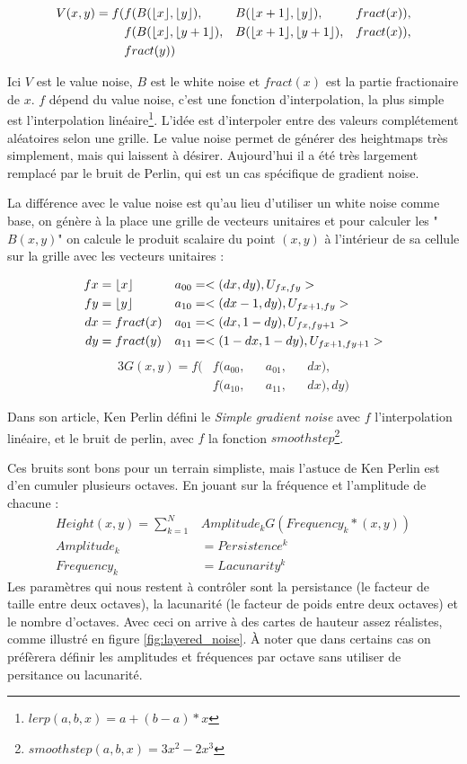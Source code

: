 \documentclass[11pt]{article} %
\DeclarePairedDelimiter\floor{\lfloor}{\rfloor}%
\DeclarePairedDelimiter\fract{fract(}{)}
\begin{document}
\begin{alignat*}{3}
	V(x,y) =f( &f(B(\floor{x},\floor{y}), &&B(\floor{x+1},\floor{y}), &&\fract{x}),\\
			&f(B(\floor{x},\floor{y+1}), &&B(\floor{x+1},\floor{y+1}), &&\fract{x}),\\
			&\fract{y})
\end{alignat*}

Ici $V$ est le value noise, $B$ est le white noise et $fract(x)$ est la partie fractionaire de $x$. $f$ dépend du value noise, c'est une fonction d'interpolation, la plus simple est l'interpolation linéaire\footnote{$lerp(a,b,x) = a+(b-a)*x$}.
L'idée est d'interpoler entre des valeurs complétement aléatoires selon une grille. Le value noise permet de générer des heightmaps très simplement, mais qui laissent à désirer. Aujourd'hui il a été très largement remplacé par le bruit de Perlin, qui est un cas spécifique de gradient noise.

La différence avec le value noise est qu'au lieu d'utiliser un white noise comme base, on génère à la place une grille de vecteurs unitaires et pour calculer les "$B(x,y)$" on calcule le produit scalaire du point $(x,y)$ à l'intérieur de sa cellule sur la grille avec les vecteurs unitaires :

\begin{align*}
	fx&=\floor{x} & a_{00}&=<(dx,dy), U_{fx,fy}>\\
	fy&=\floor{y} & a_{10}&=<(dx-1,dy), U_{fx+1,fy}>\\
	dx&=\fract{x} & a_{01}&=<(dx,1-dy), U_{fx,fy+1}>\\
	dy&=\fract{y} & a_{11}&=<(1-dx,1-dy), U_{fx+1,fy+1}>
\end{align*}
\begin{alignat*}{3}
	G(x,y) =f( &f(a_{00}, &&a_{01}, &&dx),\\
			&f(a_{10}, &&a_{11}, &&dx), dy)
\end{alignat*}

Dans son article\cite{perlinnoise}, Ken Perlin défini le \textit{Simple gradient noise} avec $f$ l'interpolation linéaire, et le bruit de perlin, avec $f$ la fonction $smoothstep$\footnote{$smoothstep(a,b,x) = 3x^2-2x^3$}.

Ces bruits sont bons pour un terrain simpliste, mais l'astuce de Ken Perlin est d'en cumuler plusieurs octaves. En jouant sur la fréquence et l'amplitude de chacune :
\begin{align*}
	Height(x,y) = \sum_{k=1}^{N}&Amplitude_k G(Frequency_k*(x,y))\\
	Amplitude_k &= Persistence^k\\ 
	Frequency_k &= Lacunarity^k
\end{align*}
Les paramètres qui nous restent à contrôler sont la persistance (le facteur de taille entre deux octaves), la lacunarité (le facteur de poids entre deux octaves) et le nombre d'octaves. Avec ceci on arrive à des cartes de hauteur assez réalistes, comme illustré en figure \ref{fig:layered_noise}. À noter que dans certains cas on préfèrera définir les amplitudes et fréquences par octave sans utiliser de persitance ou lacunarité.
\end{document}
